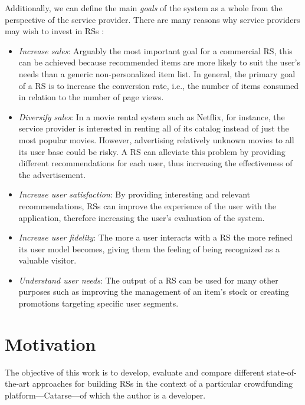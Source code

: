 \documentclass[cic,tc,english]{iiufrgs}
\begin{document}
Additionally, we can define the main \emph{goals} of the system as a whole from the perspective of the service provider. There are many reasons why service providers may wish to invest in RSs \cite{N.N2010}:
\begin{itemize}
\item \emph{Increase sales}: Arguably the most important goal for a commercial RS, this can be achieved because recommended items are more likely to suit the user's needs than a generic non-personalized item list. In general, the primary goal of a RS is to increase the conversion rate, i.e., the number of items consumed in relation to the number of page views.
\item \emph{Diversify sales}: In a movie rental system such as Netflix, for instance, the service provider is interested in renting all of its catalog instead of just the most popular movies. However, advertising relatively unknown movies to all its user base could be risky. A RS can alleviate this problem by providing different recommendations for each user, thus increasing the effectiveness of the advertisement. 
\item \emph{Increase user satisfaction}: By providing interesting and relevant recommendations, RSs can improve the experience of the user with the application, therefore increasing the user's evaluation of the system.
\item \emph{Increase user fidelity}: The more a user interacts with a RS the more refined its user model becomes, giving them the feeling of being recognized as a valuable visitor.
\item \emph{Understand user needs}: The output of a RS can be used for many other purposes such as improving the management of an item's stock or creating promotions targeting specific user segments.
\end{itemize}

\section{Motivation} \label{motivation}
The objective of this work is to develop, evaluate and compare different state-of-the-art approaches for building RSs in the context of a particular crowdfunding platform---Catarse---of which the author is a developer.
\end{document}
